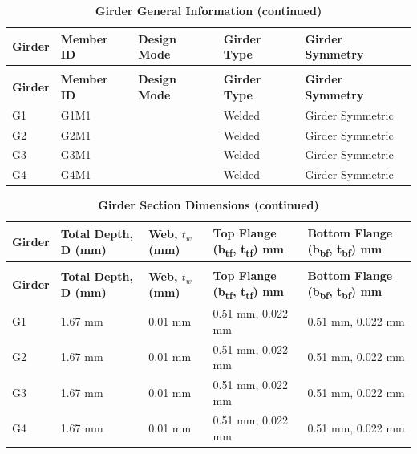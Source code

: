 \documentclass[12pt,a4paper]{report}
\numberwithin{table}{chapter}
\numberwithin{figure}{chapter}
\begin{document}
\newpage

\vspace{0.4em}
\noindent
            
\vspace{4pt}
\begin{longtable}{|L{2.2cm}|L{1.8cm}|p{3.8cm}|p{3.8cm}|p{3.8cm}|}
\caption{\textbf{Girder General Information}}\\
\hline
\textbf{Girder} & \textbf{Member ID} & \textbf{Design Mode} & \textbf{Girder Type} & \textbf{Girder Symmetry} \\[6pt]
\hline
\endfirsthead
\caption[]{\textbf{Girder General Information (continued)}}\\
\hline
\textbf{Girder} & \textbf{Member ID} & \textbf{Design Mode} & \textbf{Girder Type} & \textbf{Girder Symmetry} \\[6pt]
\hline
\endhead
\hline
\endfoot
\endlastfoot
G1 & G1M1 &  & Welded & Girder Symmetric \\[6pt]
\hline
G2 & G2M1 &  & Welded & Girder Symmetric \\[6pt]
\hline
G3 & G3M1 &  & Welded & Girder Symmetric \\[6pt]
\hline
G4 & G4M1 &  & Welded & Girder Symmetric \\[6pt]
\hline
\end{longtable}

\vspace{0.6em}

\vspace{4pt}
\begin{longtable}{|L{1.8cm}|L{2.3cm}|L{1.8cm}|p{4.8cm}|p{4.8cm}|}
\caption{\textbf{Girder Section Dimensions}}\\
\hline
\textbf{Girder} & \textbf{Total Depth, D (mm)} & \textbf{Web, $t_w$ (mm)} & \textbf{Top Flange (b\textsubscript{tf}, t\textsubscript{tf}) mm} & \textbf{Bottom Flange (b\textsubscript{bf}, t\textsubscript{bf}) mm} \\[6pt]
\hline
\endfirsthead
\caption[]{\textbf{Girder Section Dimensions (continued)}}\\
\hline
\textbf{Girder} & \textbf{Total Depth, D (mm)} & \textbf{Web, $t_w$ (mm)} & \textbf{Top Flange (b\textsubscript{tf}, t\textsubscript{tf}) mm} & \textbf{Bottom Flange (b\textsubscript{bf}, t\textsubscript{bf}) mm} \\[6pt]
\hline
\endhead
\hline
\endfoot
\endlastfoot
G1 & 1.67 mm & 0.01 mm & 0.51 mm, 0.022 mm & 0.51 mm, 0.022 mm \\[6pt]
\hline
G2 & 1.67 mm & 0.01 mm & 0.51 mm, 0.022 mm & 0.51 mm, 0.022 mm \\[6pt]
\hline
G3 & 1.67 mm & 0.01 mm & 0.51 mm, 0.022 mm & 0.51 mm, 0.022 mm \\[6pt]
\hline
G4 & 1.67 mm & 0.01 mm & 0.51 mm, 0.022 mm & 0.51 mm, 0.022 mm \\[6pt]
\hline
\end{longtable}
\end{document}
